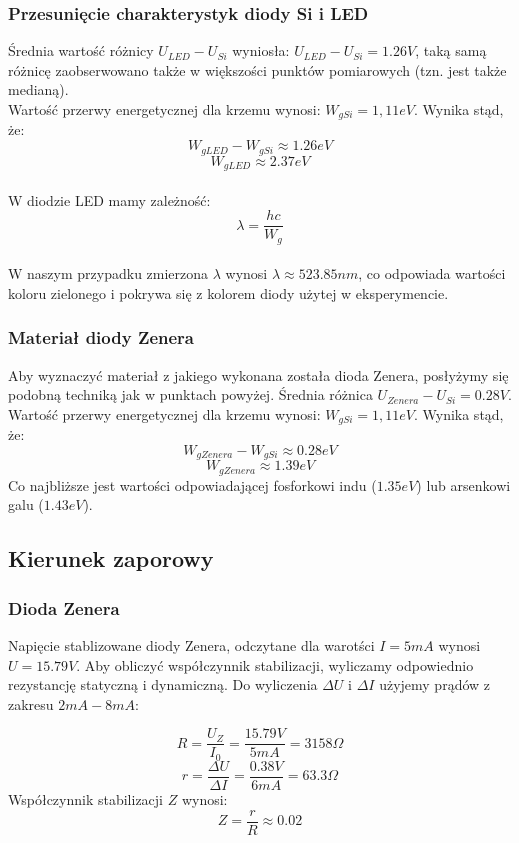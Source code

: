 \documentclass[11pt]{article}
\begin{document}
\subsubsection{Przesunięcie charakterystyk diody Si i LED}
Średnia wartość różnicy $U_{LED} - U_{Si}$ wyniosła: $U_{LED} - U_{Si} = 1.26V$, taką samą różnicę zaobserwowano także w większości punktów pomiarowych (tzn. jest także medianą).\\
\newline
Wartość przerwy energetycznej dla krzemu wynosi: $W_{gSi} = 1,11eV$. Wynika stąd, że:
$$W_{gLED} - W_{gSi} \approx 1.26eV$$
$$W_{gLED} \approx 2.37eV$$
\\
W diodzie LED mamy zależność:
$$\lambda = \frac{hc}{W_{g}}$$
\\
W naszym przypadku zmierzona $\lambda$ wynosi $\lambda \approx 523.85nm$, co odpowiada wartości koloru zielonego i pokrywa się z kolorem diody użytej w eksperymencie.
\subsubsection{Materiał diody Zenera}
Aby wyznaczyć materiał z jakiego wykonana została dioda Zenera, posłyżymy się podobną techniką jak w punktach powyżej. Średnia różnica $U_{Zenera} - U_{Si} = 0.28V$. Wartość przerwy energetycznej dla krzemu wynosi: $W_{gSi} = 1,11eV$. Wynika stąd, że:
$$W_{gZenera} - W_{gSi} \approx 0.28eV$$
$$W_{gZenera} \approx 1.39eV$$
Co najbliższe jest wartości odpowiadającej fosforkowi indu ($1.35eV$) lub arsenkowi galu ($1.43eV$).
\subsection{Kierunek zaporowy}
\subsubsection{Dioda Zenera}
Napięcie stablizowane diody Zenera, odczytane dla warotści $I = 5mA$ wynosi $U = 15.79V$.
Aby obliczyć współczynnik stabilizacji, wyliczamy odpowiednio rezystancję statyczną i dynamiczną. Do wyliczenia $\Delta U$ i $\Delta I$ użyjemy prądów z zakresu $2mA-8mA$:

$$R = \frac{U_{Z}}{I_{0}} = \frac{15.79V}{5mA} = 3158\Omega$$
$$r = \frac{\Delta U}{\Delta I} = \frac{0.38V}{6mA} = 63.3\Omega$$
Współczynnik stabilizacji $Z$ wynosi:
$$Z = \frac{r}{R} \approx 0.02$$ 
\end{document}
